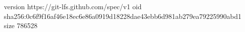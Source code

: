 version https://git-lfs.github.com/spec/v1
oid sha256:0c6f9f16af46e18ec6e86a0919d18228dae43ebb6d981ab279ea79225990abd1
size 786528
